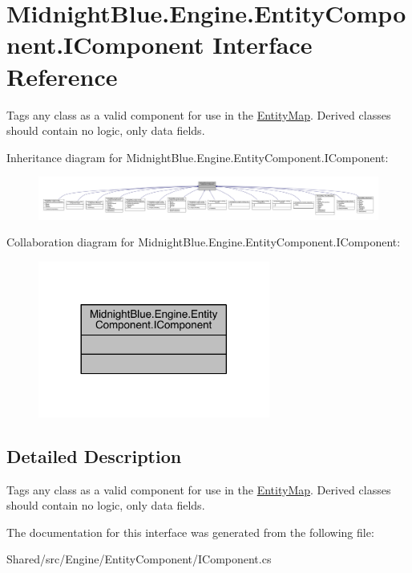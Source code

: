 \hypertarget{interface_midnight_blue_1_1_engine_1_1_entity_component_1_1_i_component}{}\section{Midnight\+Blue.\+Engine.\+Entity\+Component.\+I\+Component Interface Reference}
\label{interface_midnight_blue_1_1_engine_1_1_entity_component_1_1_i_component}


Tags any class as a valid component for use in the \hyperlink{class_midnight_blue_1_1_engine_1_1_entity_component_1_1_entity_map}{Entity\+Map}. Derived classes should contain no logic, only data fields.  




Inheritance diagram for Midnight\+Blue.\+Engine.\+Entity\+Component.\+I\+Component\+:
\nopagebreak
\begin{figure}[H]
\begin{center}
\leavevmode
\includegraphics[width=350pt]{interface_midnight_blue_1_1_engine_1_1_entity_component_1_1_i_component__inherit__graph}
\end{center}
\end{figure}


Collaboration diagram for Midnight\+Blue.\+Engine.\+Entity\+Component.\+I\+Component\+:
\nopagebreak
\begin{figure}[H]
\begin{center}
\leavevmode
\includegraphics[width=216pt]{interface_midnight_blue_1_1_engine_1_1_entity_component_1_1_i_component__coll__graph}
\end{center}
\end{figure}


\subsection{Detailed Description}
Tags any class as a valid component for use in the \hyperlink{class_midnight_blue_1_1_engine_1_1_entity_component_1_1_entity_map}{Entity\+Map}. Derived classes should contain no logic, only data fields. 



The documentation for this interface was generated from the following file\+:\begin{DoxyCompactItemize}
\item 
Shared/src/\+Engine/\+Entity\+Component/I\+Component.\+cs\end{DoxyCompactItemize}
